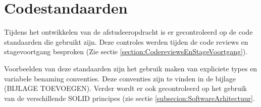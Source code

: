 \section{Codestandaarden}
Tijdens het ontwikkelen van de afstudeeropdracht is er gecontroleerd op de code standaarden die gebruikt zijn.
Deze controles werden tijden de code reviews en stagevoortgang besproken (Zie sectie \ref{section:CodereviewsEnStageVoortgang}).

\whitespace
Voorbeelden van deze standaarden zijn het gebruik maken van expliciete types en variabele benaming conventies.
Deze conventies zijn te vinden in de bijlage (BIJLAGE TOEVOEGEN).
Verder wordt er ook gecontroleerd op het gebruik van de verschillende SOLID principes (zie sectie \ref{subsecion:SoftwareArhitectuur}.
%
%
%
